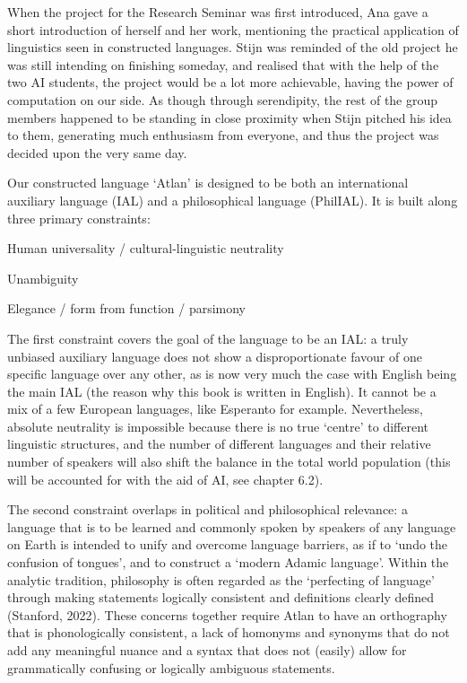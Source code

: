 When the project for the Research Seminar was first introduced, Ana gave a short introduction of herself and her work, mentioning the practical application of linguistics seen in constructed languages. Stijn was reminded of the old project he was still intending on finishing someday, and realised that with the help of the two AI students, the project would be a lot more achievable, having the power of computation on our side. As though through serendipity, the rest of the group members happened to be standing in close proximity when Stijn pitched his idea to them, generating much enthusiasm from everyone, and thus the project was decided upon the very same day.  

Our constructed language ‘Atlan’ is designed to be both an international auxiliary language (IAL) and a philosophical language (PhilIAL). It is built along three primary constraints: 

\begin{enumerate}    
    \item {Human universality / cultural-linguistic neutrality 

    \item Unambiguity 

    \item Elegance / form from function / parsimony} 
\end{enumerate}

The first constraint covers the goal of the language to be an IAL: a truly unbiased auxiliary language does not show a disproportionate favour of one specific language over any other, as is now very much the case with English being the main IAL (the reason why this book is written in English). It cannot be a mix of a few European languages, like Esperanto for example. Nevertheless, absolute neutrality is impossible because there is no true ‘centre’ to different linguistic structures, and the number of different languages and their relative number of speakers will also shift the balance in the total world population (this will be accounted for with the aid of AI, see chapter 6.2). 

The second constraint overlaps in political and philosophical relevance: a language that is to be learned and commonly spoken by speakers of any language on Earth is intended to unify and overcome language barriers, as if to ‘undo the confusion of tongues’, and to construct a ‘modern Adamic language’. Within the analytic tradition, philosophy is often regarded as the ‘perfecting of language’ through making statements logically consistent and definitions clearly defined (Stanford, 2022). These concerns together require Atlan to have an orthography that is phonologically consistent, a lack of homonyms and synonyms that do not add any meaningful nuance and a syntax that does not (easily) allow for grammatically confusing or logically ambiguous statements.  

